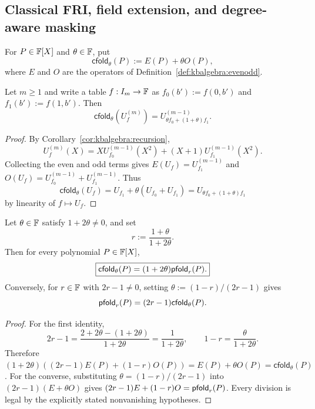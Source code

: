 \subsection{Classical FRI, field extension, and degree-aware masking}\label{sec:kbalgebra:fri}

\begin{definition}\label{def:kbalgebra:classical}
For $P\in\mathbb{F}[X]$ and $\theta\in\mathbb{F}$, put
\[
 \mathsf{cfold}_\theta(P):=E(P)+\theta O(P),
\]
where $E$ and $O$ are the operators of Definition~\ref{def:kbalgebra:evenodd}.
\end{definition}

\begin{lemma}\label{lem:kbalgebra:classical-coordinates}
Let $m\geq1$ and write a table $f:I_m\to\mathbb{F}$ as $f_0(b'):=f(0,b')$ and $f_1(b'):=f(1,b')$. Then
\[
 \mathsf{cfold}_\theta(U_f^{(m)})
 =U_{\theta f_0+(1+\theta)f_1}^{(m-1)}.
\]
\end{lemma}
\begin{proof}
By Corollary~\ref{cor:kbalgebra:recursion},
\[
 U_f^{(m)}(X)=XU_{f_0}^{(m-1)}(X^2)+(X+1)U_{f_1}^{(m-1)}(X^2).
\]
Collecting the even and odd terms gives $E(U_f)=U_{f_1}^{(m-1)}$ and $O(U_f)=U_{f_0}^{(m-1)}+U_{f_1}^{(m-1)}$. Thus
\[
 \mathsf{cfold}_\theta(U_f)=U_{f_1}+\theta(U_{f_0}+U_{f_1})
 =U_{\theta f_0+(1+\theta)f_1}
\]
by linearity of $f\mapsto U_f$.
\end{proof}

\begin{lemma}\label{lem:kbalgebra:fold-reparam}
Let $\theta\in\mathbb{F}$ satisfy $1+2\theta\neq0$, and set
\[
 r:=\frac{1+\theta}{1+2\theta}.
\]
Then for every polynomial $P\in\mathbb{F}[X]$,
\begin{equation}\label{eq:kbalgebra:fold-reparam}
 \boxed{\mathsf{cfold}_\theta(P)=(1+2\theta)\mathsf{pfold}_r(P).}
\end{equation}
Conversely, for $r\in\mathbb{F}$ with $2r-1\neq0$, setting $\theta:=(1-r)/(2r-1)$ gives
\[
 \mathsf{pfold}_r(P)=(2r-1)\mathsf{cfold}_\theta(P).
\]
\end{lemma}
\begin{proof}
For the first identity,
\[
 2r-1=\frac{2+2\theta-(1+2\theta)}{1+2\theta}
 =\frac1{1+2\theta},
 \qquad 1-r=\frac{\theta}{1+2\theta}.
\]
Therefore $(1+2\theta)((2r-1)E(P)+(1-r)O(P))=E(P)+\theta O(P)=\mathsf{cfold}_\theta(P)$. For the converse, substituting $\theta=(1-r)/(2r-1)$ into $(2r-1)(E+\theta O)$ gives $(2r-1)E+(1-r)O=\mathsf{pfold}_r(P)$. Every division is legal by the explicitly stated nonvanishing hypotheses.
\end{proof}

